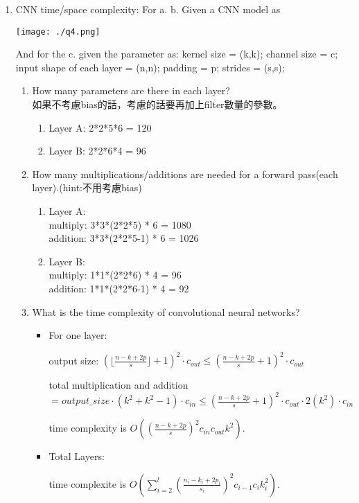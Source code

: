 \documentclass[12pt, a4paper]{article}
\begin{document}
\begin{enumerate}
\item CNN time/space complexity: For a. b. Given a CNN model as\par
    \texttt{[image: ./q4.png]}\par
And for the c. given the parameter as:
kernel size = (k,k);
channel size = c;
input shape of each layer = (n,n);
padding = p;
strides = (s,s);
\begin{enumerate}
    \item How many parameters are there in each layer?\\
    如果不考慮bias的話，考慮的話要再加上filter數量的參數。
    \begin{enumerate}
        \item Layer A: 2*2*5*6  = 120
        \item Layer B: 2*2*6*4  = 96
    \end{enumerate}
    \item How many multiplications/additions are needed for a forward pass(each layer).(hint:不用考慮bias)\\
    \begin{enumerate}
        \item Layer A: \\
        multiply: 3*3*(2*2*5) * 6 = 1080\\
        addition: 3*3*(2*2*5-1) * 6 = 1026\\
        \item Layer B: \\
        multiply: 1*1*(2*2*6) * 4 = 96\\
        addition: 1*1*(2*2*6-1) * 4 = 92\\
    \end{enumerate}
    \item What is the time complexity of convolutional neural networks?\\
    \begin{itemize}
        \item For one layer:\par
        output size: $(\lfloor\frac{n-k+2p}{s}\rfloor + 1)^2\cdot c_{out} \leq (\frac{n-k+2p}{s}+1)^2\cdot c_{out}$\par
        total multiplication and addition $= output\_size \cdot (k^2 + k^2-1) \cdot c_{in} \leq (\frac{n-k+2p}{s}+1)^2\cdot c_{out} \cdot 2(k^2) \cdot c_{in}$\par
        time complexity is $O((\frac{n-k+2p}{s})^2 c_{in} c_{out} k^2)$.\par
        \item Total Layers:\par
        time complexite is $O(\sum\limits^l_{i=2}(\frac{n_i-k_i+2p_i}{s_i})^2 c_{i-1} c_{i} k_i^2)$.
    \end{itemize}
    \iffalse
        1 + s*(time-1) + k-1 >= n, 1 + s*(time-2) + k-1 < n
        (n-k) / s + 2 > time >= (n-k) / s + 1
        time = upper((n-k)/s) + 1
        add padding:
        time = upper((n-k+2p)/s) + 1
    \fi
\end{enumerate}


\end{enumerate}
\end{document}
